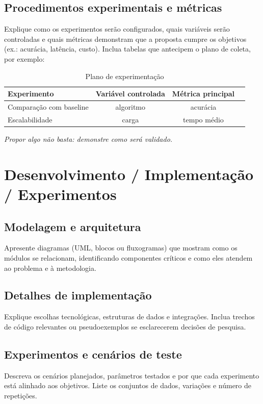 \documentclass[
    12pt,
    openright,
    oneside,
    a4paper,
    english,
    brazil
]{abntex2}
\begin{document}
\section{Procedimentos experimentais e métricas}
Explique como os experimentos serão configurados, quais variáveis serão controladas e quais métricas demonstram que a proposta cumpre os objetivos (ex.: acurácia, latência, custo). Inclua tabelas que antecipem o plano de coleta, por exemplo:
\begin{table}[htb]
  \centering
  \caption{Plano de experimentação}
  \begin{tabular}{lccc}
    \toprule
    Experimento & Variável controlada & Métrica principal \\
    \midrule
    Comparação com baseline & algoritmo & acurácia \\
    Escalabilidade & carga & tempo médio \\
    \bottomrule
  \end{tabular}
\end{table}

\textit{Propor algo não basta: demonstre como será validado.}

\chapter{Desenvolvimento / Implementação / Experimentos}

\section{Modelagem e arquitetura}
Apresente diagramas (UML, blocos ou fluxogramas) que mostram como os módulos se relacionam, identificando componentes críticos e como eles atendem ao problema e à metodologia.

\section{Detalhes de implementação}
Explique escolhas tecnológicas, estruturas de dados e integrações. Inclua trechos de código relevantes ou pseudoexemplos se esclarecerem decisões de pesquisa.

\section{Experimentos e cenários de teste}
Descreva os cenários planejados, parâmetros testados e por que cada experimento está alinhado aos objetivos. Liste os conjuntos de dados, variações e número de repetições.
\end{document}
